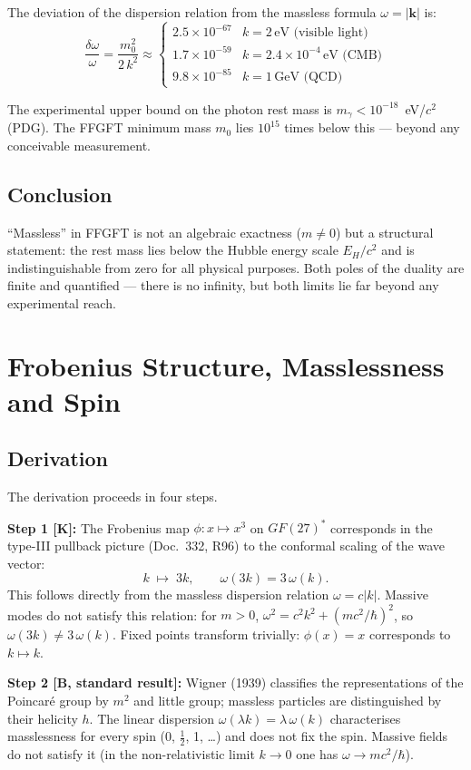 The deviation of the dispersion relation from the massless formula
$\omega=|\mathbf{k}|$ is:
\[
\frac{\delta\omega}{\omega}
= \frac{m_0^2}{2\,k^2}
\approx \begin{cases}
2{.}5\times10^{-67} & k = 2\,\text{eV (visible light)}\\
1{.}7\times10^{-59} & k = 2{.}4\times10^{-4}\,\text{eV (CMB)}\\
9{.}8\times10^{-85} & k = 1\,\text{GeV (QCD)}
\end{cases}
\]

The experimental upper bound on the photon rest mass is
$m_\gamma < 10^{-18}$~eV/$c^2$ (PDG). The FFGFT minimum mass $m_0$
lies $10^{15}$ times below this — beyond any conceivable measurement.

\subsection{Conclusion}

``Massless'' in FFGFT is not an algebraic exactness ($m\neq0$) but a
structural statement: the rest mass lies below the Hubble energy scale
$E_H/c^2$ and is indistinguishable from zero for all physical purposes.
Both poles of the duality are finite and quantified — there is no
infinity, but both limits lie far beyond any experimental reach.

\section{Frobenius Structure, Masslessness and Spin \KM}

\subsection{Derivation}

The derivation proceeds in four steps.

\textbf{Step 1 [K]:} The Frobenius map $\phi:x\mapsto x^3$ on $GF(27)^*$
corresponds in the type-III pullback picture (Doc.~332, R96) to the conformal
scaling of the wave vector:
\[
k \;\mapsto\; 3k, \qquad \omega(3k) = 3\,\omega(k).
\]
This follows directly from the massless dispersion relation $\omega=c|k|$.
Massive modes do not satisfy this relation: for $m>0$,
$\omega^2=c^2k^2+(mc^2/\hbar)^2$, so $\omega(3k)\neq3\,\omega(k)$.
Fixed points transform trivially: $\phi(x)=x$ corresponds to $k\mapsto k$.

\textbf{Step 2 [B, standard result]:} Wigner (1939) classifies the
representations of the Poincaré group by $m^2$ and little group; massless
particles are distinguished by their helicity $h$. The linear dispersion
$\omega(\lambda k)=\lambda\,\omega(k)$ characterises masslessness for every
spin (0, $\tfrac12$, 1, \ldots) and does not fix the spin. Massive fields
do not satisfy it (in the non-relativistic limit $k\to0$ one has
$\omega\to mc^2/\hbar$).

